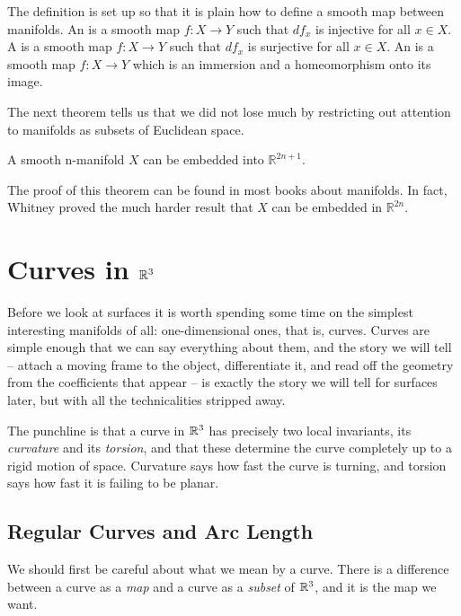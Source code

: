 \documentclass[a4paper]{scrartcl}
\begin{document}
The definition is set up so that it is plain how to define a smooth map between manifolds. An  is a smooth map $f: X \rightarrow Y$ such that $d f_{x}$ is injective for all $x \in X$. A  is a smooth map $f: X \rightarrow Y$ such that $d f_{x}$ is surjective for all $x \in X$. An  is a smooth map $f: X \rightarrow Y$ which is an immersion and a homeomorphism onto its image.

The next theorem tells us that we did not lose much by restricting out attention to manifolds as subsets of Euclidean space.

\begin{theorem}
    A smooth n-manifold $X$ can be embedded into $\mathbb{R}^{2 n+1}$.
\end{theorem}

The proof of this theorem can be found in most books about manifolds. In fact, Whitney proved the much harder result that $X$ can be embedded in $\mathbb{R}^{2 n}$.
\section{Curves in \texorpdfstring{$\mathbb{R}^3$}{R3}}

Before we look at surfaces it is worth spending some time on the simplest interesting manifolds of all: one-dimensional ones, that is, curves. Curves are simple enough that we can say everything about them, and the story we will tell -- attach a moving frame to the object, differentiate it, and read off the geometry from the coefficients that appear -- is exactly the story we will tell for surfaces later, but with all the technicalities stripped away.

The punchline is that a curve in $\mathbb{R}^3$ has precisely two local invariants, its \emph{curvature} and its \emph{torsion}, and that these determine the curve completely up to a rigid motion of space. Curvature says how fast the curve is turning, and torsion says how fast it is failing to be planar.

\subsection{Regular Curves and Arc Length}

We should first be careful about what we mean by a curve. There is a difference between a curve as a \emph{map} and a curve as a \emph{subset} of $\mathbb{R}^3$, and it is the map we want.
\end{document}
